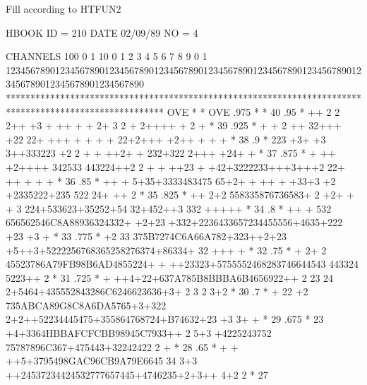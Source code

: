 \begin{minipage}[t]{.495\textwidth}
\begin{XMPfrac}{3.2}
Fill according to HTFUN2
 
HBOOK     ID =       210                                        DATE  02/09/89               NO =  4
 
CHANNELS 100 0                                                                                                  1
          10 0        1         2         3         4         5         6         7         8         9         0
           1 1234567890123456789012345678901234567890123456789012345678901234567890123456789012345678901234567890
           ********************************************************************************************************
  OVE      *                                                                                                      * OVE
     .975  *                                                                                                      *  40
     .95   *                  ++   2   2 2++  +3 +   ++     +  +     2+         3 2  + 2++++       + 2    +       *  39
     .925  *           +   +    2  ++ 32+++ +22  22+    +++    +       + +    +  22+2+++ +2++   + + +             *  38
     .9    *                   223 +3+ +3 3++333223  +2  2     +  +    ++2+ +    232+322 2+++  +24+      +        *  37
     .875  *           +   ++ +2++++ 342533 443224++2 2  +   +  ++23  +  +42+3222233+++3+++2 22+ ++   + + +       *  36
     .85   *               ++  + 5+35+3333483475 65+2+ + ++  +    +33+3 +2 +2335222+235 522 24+   ++    2         *  35
     .825  *                ++  2+2 558335876736583+ 2 +2+ + +   3   224+533623+35252+54 32+452++3 332 +++++      *  34
     .8    *            ++   + 532 656562546C8A88936324332+ +2+23 +332+2236433657234455556+4635+222 +23 +3  +     *  33
     .775  *               +2  33 375B7274C6A66A782+323++2+23  +5++3+5222256768365258276374+86334+ 32    +++ +    *  32
     .75   *            + 2+ 2 45523786A79FB98B6AD4855224+  + ++23323+5755552468283746644543 443324 5223++  2     *  31
     .725  *            + ++4+22+637A785B8BBBA6B4656922++ 2 23 24 2+5464+435552843286C6246623636+3+ 2 3 2  3+2    *  30
     .7    *       +      22 +2 735ABCA89G8C8A6DA5765+3+322  2+2++52234445475+355864768724+B74632+23 +3   3+   +  *  29
     .675  *              23 +4+3364HBBAFCFCBB98945C7933++ 2 5+3 +4225243752 75787896C367+475443+32242422 2 +     *  28
     .65   *           + + ++5+3795498GAC96CB9A79E6645 34 3+3  ++24537234424532777657445+4746235+2+3++  4+2 2     *  27

\end{XMPfrac}
\end{minipage}
